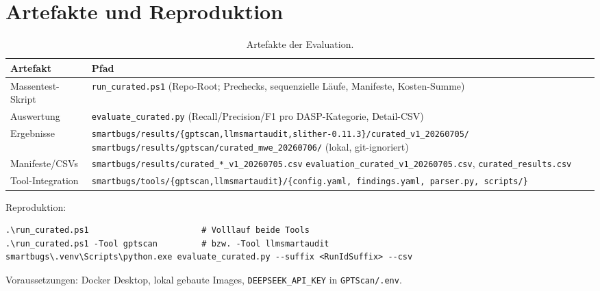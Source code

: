 \documentclass[11pt,a4paper]{scrartcl}
\newcommand{\code}[1]{\texttt{#1}}
\begin{document}
\section{Artefakte und Reproduktion}

\begin{table}[h!]
\centering
\small
\begin{tabular}{@{}L{4.2cm} L{10.5cm}@{}}
\toprule
Artefakt & Pfad \\
\midrule
Massentest-Skript & \code{run\_curated.ps1} (Repo-Root; Prechecks, sequenzielle Läufe, Manifeste, Kosten-Summe) \\
Auswertung & \code{evaluate\_curated.py} (Recall/Precision/F1 pro DASP-Kategorie, Detail-CSV) \\
Ergebnisse & \code{smartbugs/results/\{gptscan,llmsmartaudit,slither-0.11.3\}/curated\_v1\_20260705/} \newline \code{smartbugs/results/gptscan/curated\_mwe\_20260706/} (lokal, git-ignoriert) \\
Manifeste/CSVs & \code{smartbugs/results/curated\_*\_v1\_20260705.csv} \newline \code{evaluation\_curated\_v1\_20260705.csv}, \code{curated\_results.csv} \\
Tool-Integration & \code{smartbugs/tools/\{gptscan,llmsmartaudit\}/\{config.yaml, findings.yaml, parser.py, scripts/\}} \\
\bottomrule
\end{tabular}
\caption{Artefakte der Evaluation.}
\end{table}

Reproduktion:
\begin{lstlisting}
.\run_curated.ps1                       # Volllauf beide Tools
.\run_curated.ps1 -Tool gptscan         # bzw. -Tool llmsmartaudit
smartbugs\.venv\Scripts\python.exe evaluate_curated.py --suffix <RunIdSuffix> --csv
\end{lstlisting}
Voraussetzungen: Docker Desktop, lokal gebaute Images, \code{DEEPSEEK\_API\_KEY} in \code{GPTScan/.env}.
\end{document}
